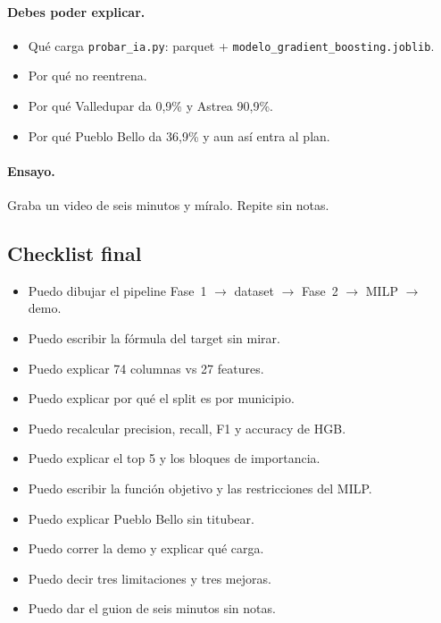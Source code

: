 \documentclass[11pt,a4paper]{article}
\newcommand{\code}[1]{\texttt{#1}}
\begin{document}
\paragraph{Debes poder explicar.}
\begin{itemize}[leftmargin=*]
  \item Qué carga \code{probar_ia.py}: parquet + \code{modelo_gradient_boosting.joblib}.
  \item Por qué no reentrena.
  \item Por qué Valledupar da 0,9\% y Astrea 90,9\%.
  \item Por qué Pueblo Bello da 36,9\% y aun así entra al plan.
\end{itemize}

\paragraph{Ensayo.}
Graba un video de seis minutos y míralo. Repite sin notas.

\subsection{Checklist final}

\begin{itemize}[leftmargin=*,label=$\square$]
  \item Puedo dibujar el pipeline Fase~1 $\rightarrow$ dataset $\rightarrow$ Fase~2 $\rightarrow$ MILP $\rightarrow$ demo.
  \item Puedo escribir la fórmula del target sin mirar.
  \item Puedo explicar 74 columnas vs 27 features.
  \item Puedo explicar por qué el split es por municipio.
  \item Puedo recalcular precision, recall, F1 y accuracy de HGB.
  \item Puedo explicar el top 5 y los bloques de importancia.
  \item Puedo escribir la función objetivo y las restricciones del MILP.
  \item Puedo explicar Pueblo Bello sin titubear.
  \item Puedo correr la demo y explicar qué carga.
  \item Puedo decir tres limitaciones y tres mejoras.
  \item Puedo dar el guion de seis minutos sin notas.
\end{itemize}

\end{document}
